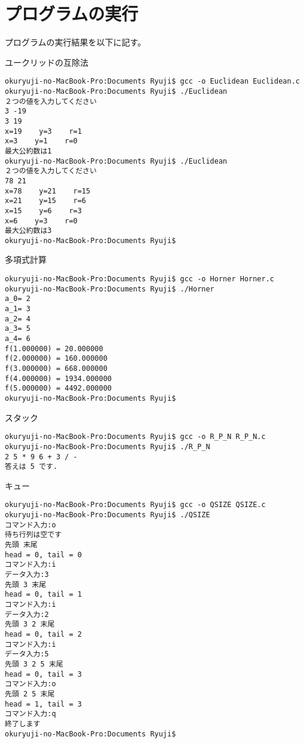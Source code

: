 \documentclass[a4j,titlepage]{jarticle}
\begin{document}
\section{プログラムの実行}
プログラムの実行結果を以下に記す。
\begin{breakitembox}[l]{ユークリッドの互除法} \small
\begin{verbatim}
okuryuji-no-MacBook-Pro:Documents Ryuji$ gcc -o Euclidean Euclidean.c
okuryuji-no-MacBook-Pro:Documents Ryuji$ ./Euclidean
２つの値を入力してください
3 -19
3 19
x=19    y=3    r=1
x=3    y=1    r=0
最大公約数は1
okuryuji-no-MacBook-Pro:Documents Ryuji$ ./Euclidean
２つの値を入力してください
78 21
x=78    y=21    r=15
x=21    y=15    r=6
x=15    y=6    r=3
x=6    y=3    r=0
最大公約数は3
okuryuji-no-MacBook-Pro:Documents Ryuji$ 

\end{verbatim}
\end{breakitembox}

\begin{breakitembox}[l]{多項式計算} \small
\begin{verbatim}
okuryuji-no-MacBook-Pro:Documents Ryuji$ gcc -o Horner Horner.c
okuryuji-no-MacBook-Pro:Documents Ryuji$ ./Horner
a_0= 2
a_1= 3
a_2= 4
a_3= 5
a_4= 6
f(1.000000) = 20.000000
f(2.000000) = 160.000000
f(3.000000) = 668.000000
f(4.000000) = 1934.000000
f(5.000000) = 4492.000000
okuryuji-no-MacBook-Pro:Documents Ryuji$ 
\end{verbatim}
\end{breakitembox}

\begin{breakitembox}[l]{スタック} \small
\begin{verbatim}
okuryuji-no-MacBook-Pro:Documents Ryuji$ gcc -o R_P_N R_P_N.c
okuryuji-no-MacBook-Pro:Documents Ryuji$ ./R_P_N
2 5 * 9 6 + 3 / - 
答えは 5 です.
\end{verbatim}
\end{breakitembox}

\begin{breakitembox}[l]{キュー} \small
\begin{verbatim}
okuryuji-no-MacBook-Pro:Documents Ryuji$ gcc -o QSIZE QSIZE.c
okuryuji-no-MacBook-Pro:Documents Ryuji$ ./QSIZE
コマンド入力:o
待ち行列は空です
先頭 末尾
head = 0, tail = 0
コマンド入力:i
データ入力:3
先頭 3 末尾
head = 0, tail = 1
コマンド入力:i
データ入力:2
先頭 3 2 末尾
head = 0, tail = 2
コマンド入力:i
データ入力:5
先頭 3 2 5 末尾
head = 0, tail = 3
コマンド入力:o
先頭 2 5 末尾
head = 1, tail = 3
コマンド入力:q
終了します
okuryuji-no-MacBook-Pro:Documents Ryuji$ 
\end{verbatim}
\end{breakitembox}
\end{document}
